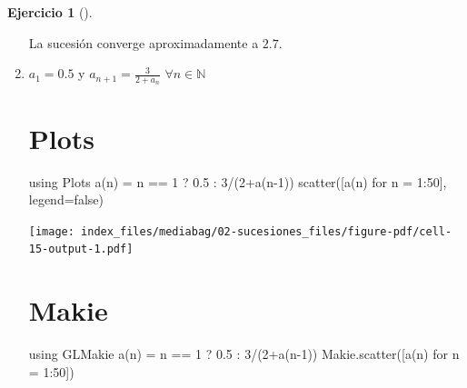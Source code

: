 \documentclass[
  a4paper,
]{scrreport}
\newenvironment{Shaded}{\begin{snugshade}}{\end{snugshade}}
\newcommand{\BuiltInTok}[1]{\textcolor[rgb]{0.00,0.23,0.31}{#1}}
\newcommand{\ConstantTok}[1]{\textcolor[rgb]{0.56,0.35,0.01}{#1}}
\newcommand{\FloatTok}[1]{\textcolor[rgb]{0.68,0.00,0.00}{#1}}
\newcommand{\FunctionTok}[1]{\textcolor[rgb]{0.28,0.35,0.67}{#1}}
\newcommand{\ImportTok}[1]{\textcolor[rgb]{0.00,0.46,0.62}{#1}}
\newcommand{\NormalTok}[1]{\textcolor[rgb]{0.00,0.23,0.31}{#1}}
\newcommand{\OperatorTok}[1]{\textcolor[rgb]{0.37,0.37,0.37}{#1}}
\theoremstyle{definition}
\newtheorem{exercise}{Ejercicio}[chapter]
\theoremstyle{remark}
\begin{document}
\begin{exercise}[]
\begin{enumerate}
\begin{tcolorbox}
  La sucesión converge aproximadamente a \(2.7\).

  \end{tcolorbox}
\item
  \(a_1 = 0.5\) y \(a_{n+1}=\frac{3}{2+a_n}\) \(\forall n\in\mathbb{N}\)

  \begin{tcolorbox}[enhanced jigsaw, bottomtitle=1mm, rightrule=.15mm, left=2mm, colback=white, title=\textcolor{quarto-callout-tip-color}{\faLightbulb}\hspace{0.5em}{Solución}, bottomrule=.15mm, colframe=quarto-callout-tip-color-frame, toprule=.15mm, leftrule=.75mm, opacityback=0, coltitle=black, breakable, colbacktitle=quarto-callout-tip-color!10!white, arc=.35mm, toptitle=1mm, titlerule=0mm, opacitybacktitle=0.6]

  \section{Plots}

\begin{Shaded}
\begin{Highlighting}[]
\ImportTok{using} \BuiltInTok{Plots}
\FunctionTok{a}\NormalTok{(n) }\OperatorTok{=}\NormalTok{  n }\OperatorTok{==} \FloatTok{1}\NormalTok{ ? }\FloatTok{0.5} \OperatorTok{:} \FloatTok{3}\OperatorTok{/}\NormalTok{(}\FloatTok{2}\FunctionTok{+a}\NormalTok{(n}\OperatorTok{{-}}\FloatTok{1}\NormalTok{))}
\FunctionTok{scatter}\NormalTok{([}\FunctionTok{a}\NormalTok{(n) for n }\OperatorTok{=} \FloatTok{1}\OperatorTok{:}\FloatTok{50}\NormalTok{], legend}\OperatorTok{=}\ConstantTok{false}\NormalTok{)}
\end{Highlighting}
\end{Shaded}

  \texttt{[image: index\_files/mediabag/02-sucesiones\_files/figure-pdf/cell-15-output-1.pdf]}

  \section{Makie}

\begin{Shaded}
\begin{Highlighting}[]
\ImportTok{using} \BuiltInTok{GLMakie}
\FunctionTok{a}\NormalTok{(n) }\OperatorTok{=}\NormalTok{ n }\OperatorTok{==} \FloatTok{1}\NormalTok{ ? }\FloatTok{0.5} \OperatorTok{:} \FloatTok{3}\OperatorTok{/}\NormalTok{(}\FloatTok{2}\FunctionTok{+a}\NormalTok{(n}\OperatorTok{{-}}\FloatTok{1}\NormalTok{))}
\NormalTok{Makie.}\FunctionTok{scatter}\NormalTok{([}\FunctionTok{a}\NormalTok{(n) for n }\OperatorTok{=} \FloatTok{1}\OperatorTok{:}\FloatTok{50}\NormalTok{])}
\end{Highlighting}
\end{Shaded}


\end{tcolorbox}
\end{enumerate}
\end{exercise}
\end{document}
